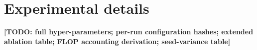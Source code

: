\documentclass{article}
\newcommand{\TODO}[1]{{\color{red}\textbf{[TODO: #1]}}}
\begin{document}
\section{Experimental details}
\label{app:details}
\TODO{full hyper-parameters; per-run configuration hashes; extended ablation
table; FLOP accounting derivation; seed-variance table}
\end{document}
